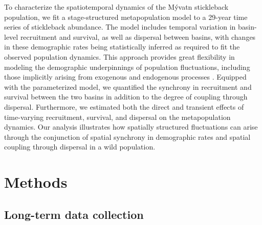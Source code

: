 \documentclass[11pt]{article}
\begin{document}
To characterize the spatiotemporal dynamics of the M\'{y}vatn stickleback population, 
we fit a stage-structured metapopulation model \citep{caswell2001matrix}
to a 29-year time series of stickleback abundance.
The model includes temporal variation in basin-level recruitment and survival, 
as well as dispersal between basins,
with changes in these demographic rates being statistically inferred 
as required to fit the observed population dynamics.
This approach provides great flexibility in modeling the demographic underpinnings of 
population fluctuations,
including those implicitly arising from exogenous and endogenous processes
\citep{zeng1998, ives2012}.
Equipped with the parameterized model, 
we quantified the synchrony in recruitment and survival between the two basins
in addition to the degree of coupling through dispersal.
Furthermore, we estimated both the direct and transient effects of 
time-varying recruitment, survival, and dispersal
on the metapopulation dynamics.
Our analysis illustrates how spatially structured fluctuations  
can arise through the conjunction of spatial synchrony in demographic rates
and spatial coupling through dispersal in a wild population. 






\section*{Methods} 



\subsection*{Long-term data collection} 
\end{document}
